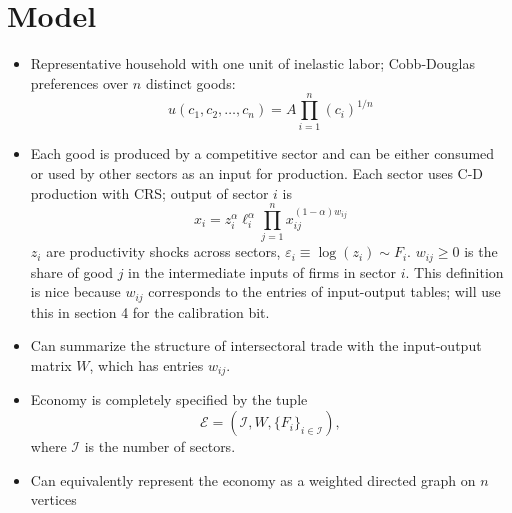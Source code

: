 \section{Model}
\begin{itemize}
\item Representative household with one unit of inelastic labor; Cobb-Douglas preferences over $n$ distinct goods:
  \[
u(c_1, c_2,\ldots, c_n) = A \prod^n_{i = 1} (c_i)^{1/n}
  \]
\item Each good is produced by a competitive sector and can be either consumed or used by other sectors as an input for production. Each sector uses C-D production with CRS; output of sector $i$ is
  \[
x_{i}=z_{i}^{\alpha} \ell_{i}^{\alpha} \prod_{j=1}^{n} x_{i j}^{(1-\alpha) w_{i j}}
  \]
  $z_i$ are productivity shocks across sectors, $\varepsilon_i \equiv \log(z_i) \sim F_i$. $w_{ij} \ge 0$ is the share of good $j$ in the intermediate inputs of firms in sector $i$. This definition is nice because $w_{ij}$ corresponds to the entries of input-output tables; will use this in section 4 for the calibration bit.
\item Can summarize the structure of intersectoral trade with the input-output matrix $W$, which has entries $w_{ij}$.
\item Economy is completely specified by the tuple
  \[
\mathcal{E} = (\mathcal{I}, W, \{F_i\}_{i \in \mathcal{I}}), 
\]
where $\mathcal{I}$ is the number of sectors.
\item Can equivalently represent the economy as a weighted directed graph on $n$ vertices
\end{itemize}


